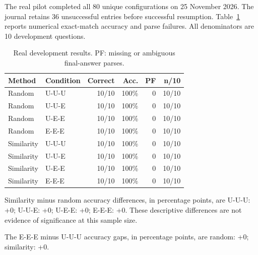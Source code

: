 The real pilot completed all 80 unique configurations on 25 November 2026. The journal retains 36 unsuccessful entries before successful resumption. Table~\ref{tab:pilot} reports numerical exact-match accuracy and parse failures. All denominators are 10 development questions.

\begin{table}[t]

\caption{Real development results. PF: missing or ambiguous final-answer parses.}

\label{tab:pilot}

\centering

\setlength{\tabcolsep}{3pt}

\begin{tabular}{llrrrr}

\toprule

Method & Condition & Correct & Acc. & PF & n/10 \\

\midrule

Random & U-U-U & 10/10 & 100\% & 0 & 10/10 \\

Random & U-U-E & 10/10 & 100\% & 0 & 10/10 \\

Random & U-E-E & 10/10 & 100\% & 0 & 10/10 \\

Random & E-E-E & 10/10 & 100\% & 0 & 10/10 \\

Similarity & U-U-U & 10/10 & 100\% & 0 & 10/10 \\

Similarity & U-U-E & 10/10 & 100\% & 0 & 10/10 \\

Similarity & U-E-E & 10/10 & 100\% & 0 & 10/10 \\

Similarity & E-E-E & 10/10 & 100\% & 0 & 10/10 \\

\bottomrule

\end{tabular}

\end{table}

Similarity minus random accuracy differences, in percentage points, are U-U-U: +0; U-U-E: +0; U-E-E: +0; E-E-E: +0. These descriptive differences are not evidence of significance at this sample size.

The E-E-E minus U-U-U accuracy gaps, in percentage points, are random: +0; similarity: +0.

